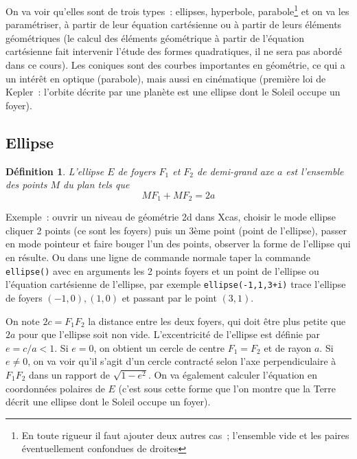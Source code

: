 \documentclass[a4paper,11pt]{book}
\newtheorem{defn}[thm]{D\'efinition}
\begin{document}
\begin{giacjshere}

On va voir qu'elles sont de trois types~: ellipses, hyperbole,
parabole\footnote{En toute rigueur il faut ajouter deux autres cas~;
l'ensemble vide et les paires \'eventuellement confondues de droites} 
et on va les param\'etriser, \`a partir de leur \'equation
cart\'esienne ou \`a partir de leurs \'el\'ements g\'eom\'etriques
(le calcul des \'el\'ements g\'eom\'etrique \`a partir de l'\'equation
cart\'esienne fait intervenir l'\'etude des formes quadratiques, il ne
sera pas abord\'e dans ce cours).
Les coniques sont des courbes importantes en g\'eom\'etrie, 
ce qui a un int\'er\^et en optique 
(parabole), mais aussi en cin\'ematique (premi\`ere loi de Kepler~:
l'orbite d\'ecrite par une plan\`ete est une ellipse dont
le Soleil occupe un foyer).


\subsection{Ellipse}
\begin{defn}
L'ellipse $E$ de foyers $F_1$ et $F_2$ de demi-grand axe
$a$ est l'ensemble des points $M$ du plan tels que 
\[ MF_1+MF_2=2a\]
\end{defn}
Exemple~: ouvrir un niveau de g\'eom\'etrie 2d dans Xcas,
choisir le mode ellipse cliquer 2 points (ce sont les foyers)
puis un 3\`eme point (point de l'ellipse), passer en mode
pointeur et faire bouger l'un des points, observer la forme
de l'ellipse qui en r\'esulte. Ou dans une ligne de commande
normale taper la commande \verb|ellipse()| avec
en arguments les 2 points foyers et un point de l'ellipse
ou l'\'equation cart\'esienne de l'ellipse, par exemple
\verb|ellipse(-1,1,3+i)| trace l'ellipse de foyers $(-1,0), (1,0)$
et passant par le point $(3,1)$.

On note $2c=F_1F_2$ la distance entre les deux foyers, qui doit \^etre
plus petite que $2a$ pour que l'ellipse soit non vide.
L'excentricit\'e de l'ellipse est d\'efinie par $e=c/a < 1$. Si $e=0$,
on obtient un cercle de centre $F_1=F_2$ et de rayon $a$. Si $e\neq 0$,
on va voir qu'il s'agit d'un cercle contracté
selon l'axe perpendiculaire \`a $F_1F_2$ dans un rapport de 
$\sqrt{1-e^2}$. On va \'egalement calculer l'\'equation en
coordonn\'ees polaires de $E$ (c'est sous cette forme
que l'on montre que la Terre d\'ecrit une ellipse 
dont le Soleil occupe un foyer).


\end{giacjshere}
\end{document}
